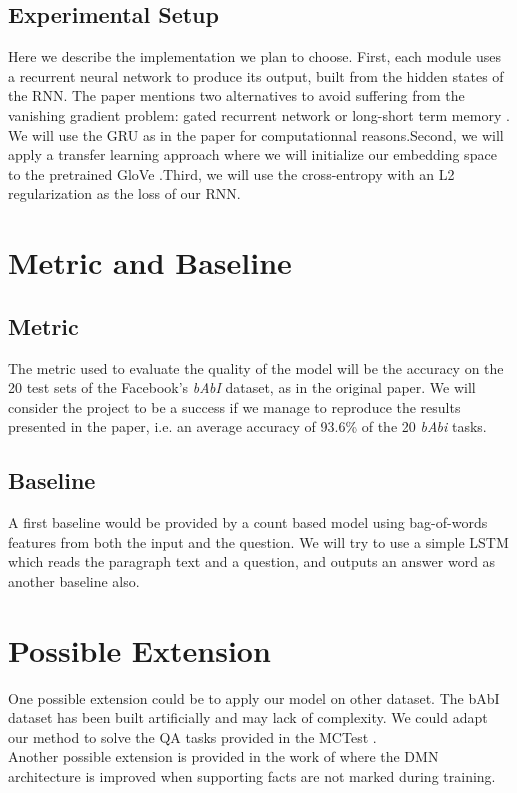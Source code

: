 \documentclass[submit]{harvardml}
\begin{document}
\subsection{Experimental Setup}

Here we describe the implementation we plan to choose. First, each module uses a recurrent neural network to produce its output, built from the hidden states of the RNN. The paper mentions two alternatives to avoid suffering from the vanishing gradient problem: gated recurrent network \cite{gru} or long-short term memory \cite{lstm}. We will use the GRU as in the paper for computationnal reasons.Second, we will apply a transfer learning approach where we will initialize our embedding space to the pretrained GloVe \cite{glove}.Third, we will use the cross-entropy with an L2 regularization as the loss of our RNN.

\section{Metric and Baseline}

\subsection{Metric}
The metric used to evaluate the quality of the model will be the accuracy on the 20 test sets of the Facebook's \emph{bAbI} dataset, as in the original paper. We will consider the project to be a success if we manage to reproduce the results presented in the paper, i.e. an average accuracy of 93.6\% of the 20 \emph{bAbi} tasks.

\subsection{Baseline}

A first baseline would be provided by a count based model using bag-of-words features from both the input and the question. We will try to use a simple LSTM which reads the paragraph text and a question,
and outputs an answer word as another baseline also.

\section{Possible Extension}

One possible extension could be to apply our model on other dataset. The bAbI dataset has been built artificially and may lack of complexity. We could adapt our method to solve the QA tasks provided in the MCTest \cite{mctest}.\\
Another possible extension is provided in the work of \cite{dmnvqa} where the DMN architecture is improved when supporting facts are not marked during training. 




\end{document}
